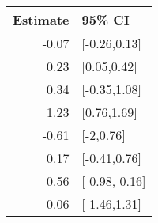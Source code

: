\begin{tabular}{rl}
  \hline
Estimate & 95\% CI \\ 
  \hline
-0.07 & [-0.26,0.13] \\ 
  0.23 & [0.05,0.42] \\ 
  0.34 & [-0.35,1.08] \\ 
  1.23 & [0.76,1.69] \\ 
  -0.61 & [-2,0.76] \\ 
  0.17 & [-0.41,0.76] \\ 
  -0.56 & [-0.98,-0.16] \\ 
  -0.06 & [-1.46,1.31] \\ 
   \hline
\end{tabular}

